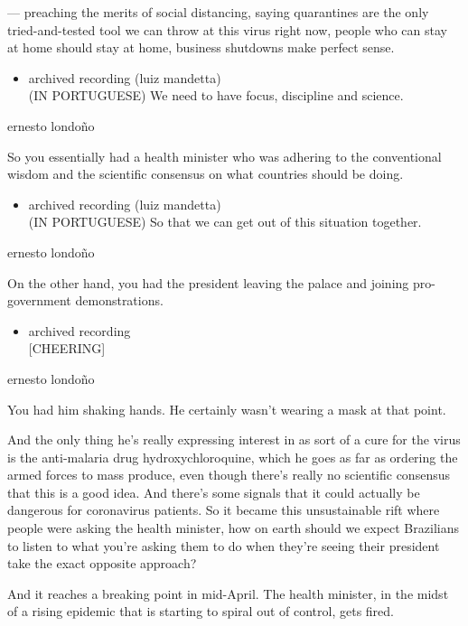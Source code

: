 --- preaching the merits of social distancing, saying quarantines are
the only tried-and-tested tool we can throw at this virus right now,
people who can stay at home should stay at home, business shutdowns make
perfect sense.

\begin{itemize}
\tightlist
\item
  archived recording (luiz mandetta)\\
  (IN PORTUGUESE) We need to have focus, discipline and science.
\end{itemize}

ernesto londoño

So you essentially had a health minister who was adhering to the
conventional wisdom and the scientific consensus on what countries
should be doing.

\begin{itemize}
\tightlist
\item
  archived recording (luiz mandetta)\\
  (IN PORTUGUESE) So that we can get out of this situation together.
\end{itemize}

ernesto londoño

On the other hand, you had the president leaving the palace and joining
pro-government demonstrations.

\begin{itemize}
\tightlist
\item
  archived recording\\
  {[}CHEERING{]}
\end{itemize}

ernesto londoño

You had him shaking hands. He certainly wasn't wearing a mask at that
point.

And the only thing he's really expressing interest in as sort of a cure
for the virus is the anti-malaria drug hydroxychloroquine, which he goes
as far as ordering the armed forces to mass produce, even though there's
really no scientific consensus that this is a good idea. And there's
some signals that it could actually be dangerous for coronavirus
patients. So it became this unsustainable rift where people were asking
the health minister, how on earth should we expect Brazilians to listen
to what you're asking them to do when they're seeing their president
take the exact opposite approach?

And it reaches a breaking point in mid-April. The health minister, in
the midst of a rising epidemic that is starting to spiral out of
control, gets fired.

